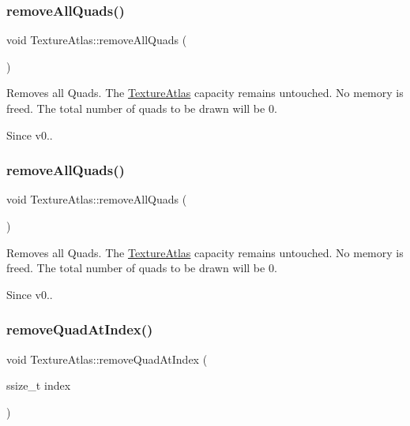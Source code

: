 \subsubsection{\texorpdfstring{remove\+All\+Quads()}{removeAllQuads()}\hspace{0.1cm}{\footnotesize\ttfamily [1/2]}}
{\footnotesize\ttfamily void Texture\+Atlas\+::remove\+All\+Quads (\begin{DoxyParamCaption}{ }\end{DoxyParamCaption})}

Removes all Quads. The \hyperlink{classTextureAtlas}{Texture\+Atlas} capacity remains untouched. No memory is freed. The total number of quads to be drawn will be 0. \begin{DoxySince}{Since}
v0.. 
\end{DoxySince}
\mbox{\label{classTextureAtlas_aff17a9d95e8b279381d4b4820d0893f4}} 
\subsubsection{\texorpdfstring{remove\+All\+Quads()}{removeAllQuads()}\hspace{0.1cm}{\footnotesize\ttfamily [2/2]}}
{\footnotesize\ttfamily void Texture\+Atlas\+::remove\+All\+Quads (\begin{DoxyParamCaption}{ }\end{DoxyParamCaption})}

Removes all Quads. The \hyperlink{classTextureAtlas}{Texture\+Atlas} capacity remains untouched. No memory is freed. The total number of quads to be drawn will be 0. \begin{DoxySince}{Since}
v0.. 
\end{DoxySince}
\mbox{\label{classTextureAtlas_a67ab93a008f52e7d204ae8a402f71a9b}} 
\subsubsection{\texorpdfstring{remove\+Quad\+At\+Index()}{removeQuadAtIndex()}\hspace{0.1cm}{\footnotesize\ttfamily [1/2]}}
{\footnotesize\ttfamily void Texture\+Atlas\+::remove\+Quad\+At\+Index (\begin{DoxyParamCaption}\item[{ssize\+\_\+t}]{index }\end{DoxyParamCaption})}

